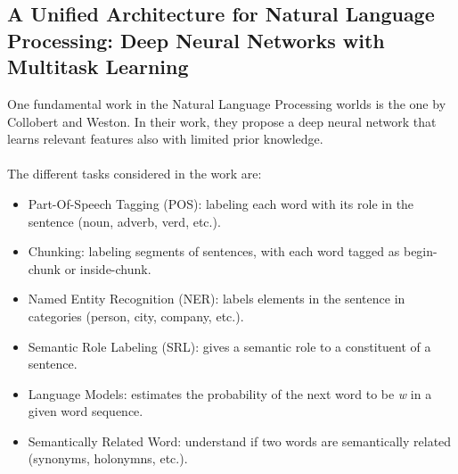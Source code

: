 \documentclass[a4paper,12pt]{report}
\begin{document}
	\subsection{A Unified Architecture for Natural Language Processing: Deep Neural Networks with Multitask Learning}
	One fundamental work in the Natural Language Processing worlds is the one by Collobert and Weston\cite{unified}. In their work, they propose a deep neural network that learns relevant features also with limited prior knowledge.\\\\
	The different tasks considered in the work are:
	\begin{itemize}
		\item Part-Of-Speech Tagging (POS): labeling each word with its role in the sentence (noun, adverb, verd, etc.).
		\item Chunking: labeling segments of sentences, with each word tagged as begin-chunk or inside-chunk.
		\item Named Entity Recognition (NER): labels elements in the sentence in categories (person, city, company, etc.).
		\item Semantic Role Labeling (SRL): gives a semantic role to a constituent of a sentence.
		\item Language Models: estimates the probability of the next word to be \textit{w} in a given word sequence.
		\item Semantically Related Word: understand if two words are semantically related (synonyms, holonymns, etc.).
	\end{itemize}
\end{document}
